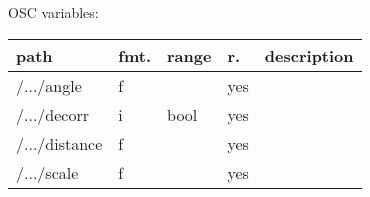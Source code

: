 \begin{snugshade}
{\footnotesize
\label{osctab:receivermodortf}
OSC variables:
\nopagebreak

\begin{tabularx}{\textwidth}{llllX}
\hline
path & fmt. & range & r. & description\\
\hline
/.../angle & f &  & yes & \\
/.../decorr & i & bool & yes & \\
/.../distance & f &  & yes & \\
/.../scale & f &  & yes & \\
\hline
\end{tabularx}
}
\end{snugshade}
